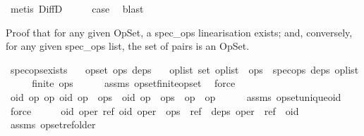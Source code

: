 \begin{isabellebody}
\ {\isacharparenleft}metis\ DiffD{}{\isacharparenright}\isanewline
\ \ \isamarkupfalse%
\ \isamarkupfalse%
\ {\isacharquery}case\ \isamarkupfalse%
\ blast\isanewline
{}\isamarkupfalse%
%
\endisatagproof
{\isafoldproof}%
%
\isadelimproof
%
\endisadelimproof
%
\begin{isamarkuptext}%
Proof that for any given OpSet, a spec\_ops linearisation exists;
and, conversely, for any given spec\_ops list, the set of pairs is an OpSet.%
\end{isamarkuptext}\isamarkuptrue%
\isamarkupfalse%
\ spec{\isacharunderscore}ops{\isacharunderscore}exists{\isacharcolon}\isanewline
\ \ \ {\isachardoublequoteopen}opset\ ops\ deps{\isachardoublequoteclose}\isanewline
\ \ \ {\isachardoublequoteopen}{\isasymexists}op{\isacharunderscore}list{\isachardot}\ set\ op{\isacharunderscore}list\ {\isacharequal}\ ops\ {\isasymand}\ spec{\isacharunderscore}ops\ deps\ op{\isacharunderscore}list{\isachardoublequoteclose}\isanewline
%
\isadelimproof
%
\endisadelimproof
%
\isatagproof
{}\isamarkupfalse%
\ {\isacharminus}\isanewline
\ \ \isamarkupfalse%
\ {\isachardoublequoteopen}finite\ ops{\isachardoublequoteclose}\isanewline
\ \ \ \ \isamarkupfalse%
\ assms\ opset{\isachardot}finite{\isacharunderscore}opset\ \isamarkupfalse%
\ force\isanewline
\ \ \isamarkupfalse%
\ \isamarkupfalse%
\ {\isachardoublequoteopen}{\isasymAnd}oid\ op{}\ op{}{\isachardot}\ {\isacharparenleft}oid{\isacharcomma}\ op{}{\isacharparenright}\ {\isasymin}\ ops\ {\isasymLongrightarrow}\ {\isacharparenleft}oid{\isacharcomma}\ op{}{\isacharparenright}\ {\isasymin}\ ops\ {\isasymLongrightarrow}\ op{}\ {\isacharequal}\ op{}{\isachardoublequoteclose}\isanewline
\ \ \ \ \isamarkupfalse%
\ assms\ opset{\isachardot}unique{\isacharunderscore}oid\ \isamarkupfalse%
\ force\isanewline
\ \ \isamarkupfalse%
\ \isamarkupfalse%
\ {\isachardoublequoteopen}{\isasymAnd}oid\ oper\ ref{\isachardot}\ {\isacharparenleft}oid{\isacharcomma}\ oper{\isacharparenright}\ {\isasymin}\ ops\ {\isasymLongrightarrow}\ ref\ {\isasymin}\ deps\ oper\ {\isasymLongrightarrow}\ ref\ {\isacharless}\ oid{\isachardoublequoteclose}\isanewline
\ \ \ \ \isamarkupfalse%
\ assms\ opset{\isachardot}ref{\isacharunderscore}older\ \isamarkupfalse%

\end{isabellebody}
